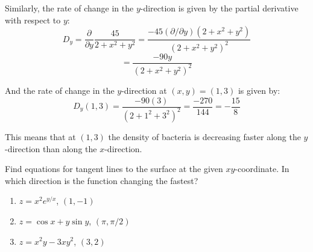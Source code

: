 Similarly, the rate of change in the $y$-direction is given by the partial 
derivative with respect to $y$:
$$D_y = \frac{\partial}{\partial y} \frac{45}{2 + x^2 + y^2} = \frac{-45 \left(
\partial/\partial y \right) \left(2 + x^2 + y^2 \right)}{\left( 2 + x^2 + y^2 
\right)^2}$$
$$= \frac{-90y}{\left(2 + x^2 + y^2 \right)^2}$$

And the rate of change in the $y$-direction at $(x, y) = (1, 3)$ is given by:
$$D_y(1, 3) = \frac{-90(3)}{\left(2 + 1^2 + 3^2 \right)^2} = \frac{-270}{144} 
= -\frac{15}{8}$$

This means that at $(1, 3)$ the density of bacteria is decreasing faster along 
the $y$-direction than along the $x$-direction. 

\begin{Exercise}[title = {Using partial derivatives to find tangent lines}, 
label = tangent]
Find equations for tangent lines to the surface at the given $xy$-coordinate. 
In which direction is the function changing the fastest?
\begin{enumerate}
\item $z = x^2e^{y/x}$, $(1, -1)$
\item $z = \cos{x} + y\sin{y}$, $(\pi, \pi/2)$
\item $z = x^2y - 3xy^2$, $(3, 2)$
\end{enumerate}
\vspace{75mm}
\end{Exercise}


